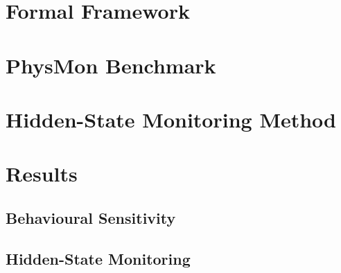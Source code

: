 \documentclass[letterpaper]{article}
\begin{document}
\section{Formal Framework}

\section{PhysMon Benchmark}

\section{Hidden-State Monitoring Method}

\section{Results}

\subsection{Behavioural Sensitivity}

\subsection{Hidden-State Monitoring}
\end{document}
